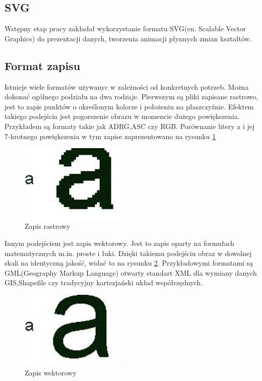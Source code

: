 \subsection{SVG}
\label{subsec:svg}

Wstępny etap pracy zakładał wykorzystanie formatu SVG(en. Scalable Vector Graphics) do prezentacji danych, tworzenia animacji płynnych zmian kształtów.

\subsection{Format zapisu}
\label{subsec:zapis}

Istnieje wiele formatów używanyc w zależności od konkretnych potrzeb. Można dokonać ogólnego podziału na dwa rodzaje. Pierwszym są pliki zapisane rastrowo, jest to zapis punktów o określonym kolorze i położeniu na płaszczyźnie. Efektem takiego podejścia jest pogorszenie obrazu w momencie dużego powiększenia. Przykładem są formaty takie jak ADRG,ASC czy RGB.
Porównanie litery a i jej 7-krotnego powiększenia w tym zapise zaprezentowano na rysunku \ref{fig:rast}
  \begin{figure}[H]
  \centering
    \includegraphics[width=50mm]{ge/a2.jpg}
  \caption{Zapis rastrowy}
  \label{fig:rast}
  \end{figure}

Innym podejściem jest zapis wektorowy. Jest to zapis oparty na formułach matematycznych m.in. proste i łuki. Dzięki takiemu podejściu obraz w dowolnej skali na identyczną jakość, widać to na rysunku \ref{fig:wekt}. Przykładowymi formatami są GML(Geography Markup Language) otwarty standart XML dla wymiany danych GIS,Shapefile czy tradycyjny kartezjański układ współrzędnych.

  \begin{figure}[H]
  \centering
    \includegraphics[width=50mm]{ge/a1.jpg}
  \caption{Zapis wektorowy}
  \label{fig:wekt}
  \end{figure}

